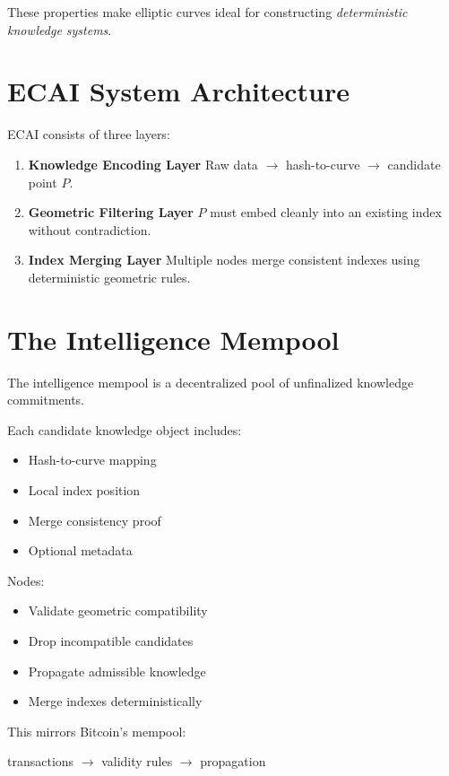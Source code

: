 \documentclass[11pt]{article}
\begin{document}
These properties make elliptic curves ideal for constructing \emph{deterministic knowledge systems}.

\section{ECAI System Architecture}

ECAI consists of three layers:
\begin{enumerate}
    \item \textbf{Knowledge Encoding Layer}  
    Raw data $\rightarrow$ hash-to-curve $\rightarrow$ candidate point $P$.

    \item \textbf{Geometric Filtering Layer}  
    $P$ must embed cleanly into an existing index without contradiction.

    \item \textbf{Index Merging Layer}  
    Multiple nodes merge consistent indexes using deterministic geometric rules.
\end{enumerate}

\section{The Intelligence Mempool}

The intelligence mempool is a decentralized pool of unfinalized knowledge commitments.

Each candidate knowledge object includes:
\begin{itemize}[noitemsep]
    \item Hash-to-curve mapping
    \item Local index position
    \item Merge consistency proof
    \item Optional metadata
\end{itemize}

Nodes:
\begin{itemize}[noitemsep]
    \item Validate geometric compatibility
    \item Drop incompatible candidates
    \item Propagate admissible knowledge
    \item Merge indexes deterministically
\end{itemize}

This mirrors Bitcoin’s mempool:
\begin{center}
transactions $\rightarrow$ validity rules $\rightarrow$ propagation
\end{center}
\end{document}
